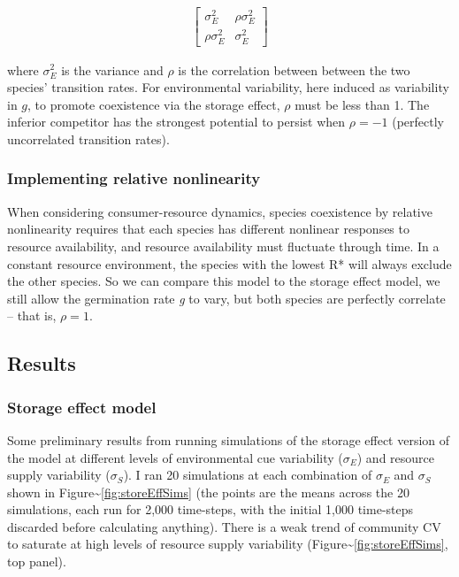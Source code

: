 \documentclass[12pt,]{article}
\begin{document}
\begin{align}
\begin{bmatrix}
\sigma^2_{E} & \rho\sigma^2_{E} \\
\rho\sigma^2_{E} & \sigma^2_{E}
\end{bmatrix}
\end{align}

\noindent{}where $\sigma^2_{E}$ is the variance and $\rho$ is the
correlation between between the two species' transition rates. For
environmental variability, here induced as variability in $g$, to
promote coexistence via the storage effect, $\rho$ must be less than 1.
The inferior competitor has the strongest potential to persist when
$\rho=-1$ (perfectly uncorrelated transition rates).

\subsubsection{Implementing relative
nonlinearity}\label{implementing-relative-nonlinearity}

When considering consumer-resource dynamics, species coexistence by
relative nonlinearity requires that each species has different nonlinear
responses to resource availability, and resource availability must
fluctuate through time. In a constant resource environment, the species
with the lowest R* will always exclude the other species. So we can
compare this model to the storage effect model, we still allow the
germination rate \emph{g} to vary, but both species are perfectly
correlate -- that is, $\rho=1$.

\subsection{Results}\label{results}

\subsubsection{Storage effect model}\label{storage-effect-model}

Some preliminary results from running simulations of the storage effect
version of the model at different levels of environmental cue
variability ($\sigma_{E}$) and resource supply variability
($\sigma_{S}$). I ran 20 simulations at each combination of $\sigma_{E}$
and $\sigma_{S}$ shown in Figure\textasciitilde{}\ref{fig:storeEffSims}
(the points are the means across the 20 simulations, each run for 2,000
time-steps, with the initial 1,000 time-steps discarded before
calculating anything). There is a weak trend of community CV to saturate
at high levels of resource supply variability
(Figure\textasciitilde{}\ref{fig:storeEffSims}, top panel).
\end{document}
